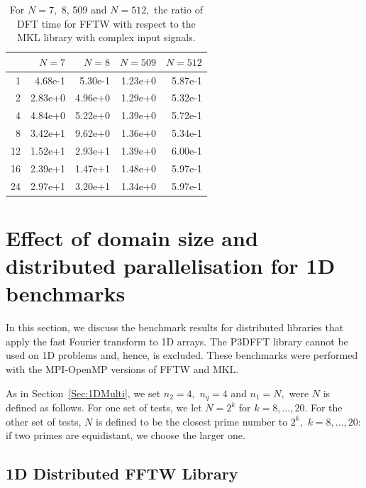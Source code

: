 \documentclass[a4paper]{article}
\begin{document}
\begin{table}
\begin{center}
\begin{tabular}{|r||r|r|r|r|}
  \hline
  &   $N=7$ & $N=8$ & $N=509$ & $N=512$ \\ \hline
   1  &     4.68e-1 &   5.30e-1 &   1.23e+0 &   5.87e-1  \\
   2  &     2.83e+0 &   4.96e+0 &   1.29e+0 &   5.32e-1  \\
   4  &     4.84e+0 &   5.22e+0 &   1.39e+0 &   5.72e-1  \\
   8  &     3.42e+1 &   9.62e+0 &   1.36e+0 &   5.34e-1  \\
   12 &     1.52e+1 &   2.93e+1 &   1.39e+0 &   6.00e-1  \\
   16 &     2.39e+1 &   1.47e+1 &   1.48e+0 &   5.97e-1  \\
   24 &     2.97e+1 &   3.20e+1 &   1.34e+0 &   5.97e-1  \\ \hline
\end{tabular}
\caption{ For $N=7,$ 8, 509 and $N=512,$ the ratio of DFT time for FFTW with respect to the MKL library with complex input signals. }\label{Tbl:DFTd3dc}
\end{center}
\end{table}

\clearpage

\section{Effect of domain size and distributed parallelisation for 1D benchmarks}\label{Sec:1DDistr}
In this section, we discuss the benchmark results for distributed
libraries that apply the fast Fourier transform to 1D arrays.  The
P3DFFT library cannot be used on 1D problems and, hence, is
excluded. These benchmarks were performed with the MPI-OpenMP versions
of FFTW and MKL. 

As in Section~\ref{Sec:1DMulti}, we set $n_2=4,$ $n_q=4$ and $n_1=N,$ were $N$ is
defined as follows.  For one set of tests, we let $N=2^k$ for
$k=8,\ldots,20.$ For the other set of tests, $N$ is defined to be the
closest prime number to $2^k,$ $k=8,\ldots,20:$ if two primes are
equidistant, we choose the larger one.

\subsection{1D Distributed FFTW Library}\label{Sec:1DDistFFTW}
\end{document}
